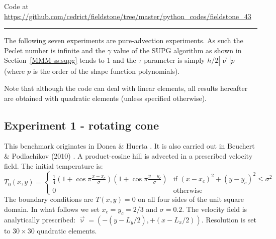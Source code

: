 

\begin{center}
Code at \url{https://github.com/cedrict/fieldstone/tree/master/python_codes/fieldstone_43}
\end{center}

\par\noindent\rule{\textwidth}{0.4pt}

The following seven experiments are pure-advection experiments. As such the Peclet number
is infinite and the $\gamma$ value of the SUPG algorithm as shown in Section~\ref{MMM-ss:supg} tends to 1
and the $\tau$ parameter is simply $h/2 |\vec\upnu| p$ (where $p$ is the order of 
the shape function polynomials).

Note that although the code can deal with linear elements, all results 
hereafter are obtained with quadratic elements (unless specified otherwise). 


\subsection*{Experiment 1 - rotating cone}

This benchmark originates in Donea \& Huerta \cite{dohu03}. 
It is also carried out in Beuchert \& Podlachikov (2010) \cite{bepo10}.
A product-cosine hill is advected in a prescribed velocity field. 
The initial temperature is:
\begin{equation}
T_0(x,y)=
\left\{
\begin{array}{cc}
\frac{1}{4}
\left(1+\cos \pi\frac{x-x_c}{\sigma}\right)
\left(1+\cos \pi\frac{y-y_c}{\sigma}\right)
& \text{if } (x-x_c)^2+(y-y_c)^2\leq \sigma^2 \\
0 & \text{otherwise}
\end{array}
\right.
\end{equation}
The boundary conditions are $T(x,y)=0$ on all four sides of the unit square domain. 
In what follows we set $x_c=y_c=2/3$ and $\sigma=0.2$.  
The velocity field is analytically prescribed: $\vec\upnu=(-(y-L_y/2),+(x-L_x/2))$.
Resolution is set to $30\times30$ quadratic elements.


